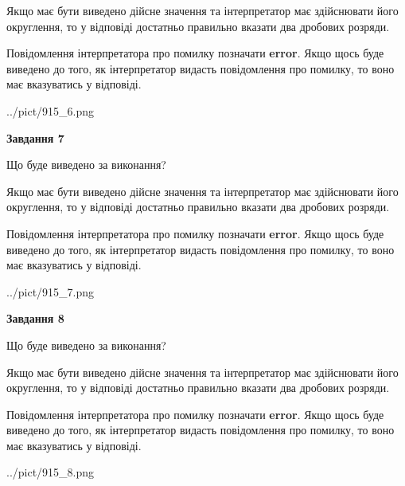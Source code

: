 \documentclass[12pt, ukrainian]{article}
\begin{document}
{\begin {Large}
Якщо має бути виведено дійсне значення та інтерпретатор має здійснювати його округлення, 
то у відповіді достатньо правильно вказати два дробових розряди.

Повідомлення інтерпретатора про помилку позначати \textbf{error}.
Якщо щось буде виведено до того, як інтерпретатор видасть повідомлення про помилку, 
то воно має вказуватись у відповіді. \par

\begin{center}
	{../pict/915_6.png}
\end{center}
\newpage

{\begin {center}\textbf{Завдання 7}\end {center}}\par
Що буде виведено за виконання? \par

Якщо має бути виведено дійсне значення та інтерпретатор має здійснювати його округлення, 
то у відповіді достатньо правильно вказати два дробових розряди.

Повідомлення інтерпретатора про помилку позначати \textbf{error}.
Якщо щось буде виведено до того, як інтерпретатор видасть повідомлення про помилку, 
то воно має вказуватись у відповіді. \par

\begin{center}
	{../pict/915_7.png}
\end{center}
\newpage

{\begin {center}\textbf{Завдання 8}\end {center}}\par
Що буде виведено за виконання? \par

Якщо має бути виведено дійсне значення та інтерпретатор має здійснювати його округлення, 
то у відповіді достатньо правильно вказати два дробових розряди.

Повідомлення інтерпретатора про помилку позначати \textbf{error}.
Якщо щось буде виведено до того, як інтерпретатор видасть повідомлення про помилку, 
то воно має вказуватись у відповіді. \par

\begin{center}
	{../pict/915_8.png}
\end{center}
\newpage


\end{Large}}
\end{document}
